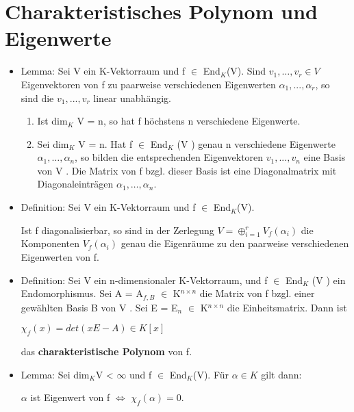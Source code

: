 \section{Charakteristisches Polynom und Eigenwerte}
\begin{itemize}
\item Lemma: Sei V ein K-Vektorraum und f $\in$ End$_K$(V). Sind $v_1, …, v_r \in V$ Eigenvektoren von f zu paarweise verschiedenen Eigenwerten $\alpha_1, ..., \alpha_r$, so sind die $v_1, ..., v_r$ linear unabhängig.
\begin{enumerate}
\item Ist dim$_K$ V = n, so hat f höchstens n verschiedene Eigenwerte.
\item Sei dim$_K$ V = n. Hat f $\in$ End$_K$ (V ) genau n verschiedene Eigenwerte $\alpha_1, …, \alpha_n$, so bilden die entsprechenden Eigenvektoren $v_1, ..., v_n$ eine Basis von V . Die Matrix von f bzgl. dieser Basis ist eine Diagonalmatrix mit Diagonaleinträgen $\alpha_1, …, \alpha_n$.
\end{enumerate}
\item Definition: Sei V ein K-Vektorraum und f $\in$ End$_K$(V).
Ist f diagonalisierbar, so sind in der Zerlegung $V = \oplus_{i=1}^{r} V_f (\alpha_i)$ die Komponenten $V_f (\alpha_i)$ genau die Eigenräume zu den paarweise verschiedenen Eigenwerten von f.
\item Definition: Sei V ein n-dimensionaler K-Vektorraum, und f $\in$ End$_K$ (V ) ein Endomorphismus. Sei A = A$_{f,B}$ $\in$ K$^{n \times n}$ die Matrix von f bzgl. einer gewählten Basis B von V . Sei E = E$_n$ $\in$ K$^{n \times n}$ die Einheitsmatrix. Dann ist
\begin{center}
$\chi_f (x) = det(xE - A) \in K[x]$
\end{center}
das \textbf{charakteristische Polynom} von f.
\item Lemma: Sei dim$_K$V < $\infty$ und f $\in$ End$_K$(V). Für $\alpha \in K$ gilt dann:
\begin{center}
$\alpha$ ist Eigenwert von f $\Leftrightarrow$ $\chi_f(\alpha) = 0$.
\end{center}
\end{itemize}


